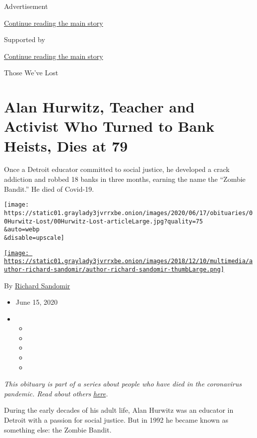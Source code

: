 Advertisement

\protect\hyperlink{after-top}{Continue reading the main story}

Supported by

\protect\hyperlink{after-sponsor}{Continue reading the main story}

Those We've Lost

\hypertarget{alan-hurwitz-teacher-and-activist-who-turned-to-bank-heists-dies-at-79}{%
\section{Alan Hurwitz, Teacher and Activist Who Turned to Bank Heists,
Dies at
79}\label{alan-hurwitz-teacher-and-activist-who-turned-to-bank-heists-dies-at-79}}

Once a Detroit educator committed to social justice, he developed a
crack addiction and robbed 18 banks in three months, earning the name
the ``Zombie Bandit.'' He died of Covid-19.

\texttt{[image: https://static01.graylady3jvrrxbe.onion/images/2020/06/17/obituaries/00Hurwitz-Lost/00Hurwitz-Lost-articleLarge.jpg?quality=75\\\&auto=webp\\\&disable=upscale]}

\href{https://www.nytimes3xbfgragh.onion/by/richard-sandomir}{\texttt{[image: https://static01.graylady3jvrrxbe.onion/images/2018/12/10/multimedia/author-richard-sandomir/author-richard-sandomir-thumbLarge.png]}}

By \href{https://www.nytimes3xbfgragh.onion/by/richard-sandomir}{Richard
Sandomir}

\begin{itemize}
\item
  June 15, 2020
\item
  \begin{itemize}
  \item
  \item
  \item
  \item
  \item
  \end{itemize}
\end{itemize}

\emph{This obituary is part of a series about people who have died in
the coronavirus pandemic. Read about others}
\href{https://www.nytimes3xbfgragh.onion/interactive/2020/obituaries/people-died-coronavirus-obituaries.html}{\emph{here}}\emph{.}

During the early decades of his adult life, Alan Hurwitz was an educator
in Detroit with a passion for social justice. But in 1992 he became
known as something else: the Zombie Bandit.

